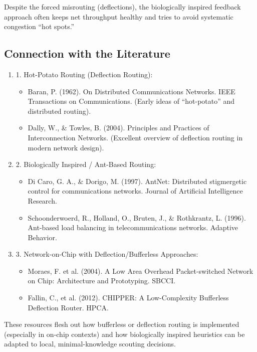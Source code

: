 Despite the forced misrouting (deflections), the biologically inspired feedback approach often keeps net throughput healthy and tries to avoid systematic congestion ``hot spots.''

\subsection{Connection with the Literature}%

\begin{enumerate}
\item 	1.	Hot-Potato Routing (Deflection Routing):
	\begin{itemize}
	\item Baran, P. (1962). On Distributed Communications Networks. IEEE Transactions on Communications. (Early ideas of “hot-potato” and distributed routing).
	\item Dally, W., \& Towles, B. (2004). Principles and Practices of Interconnection Networks. (Excellent overview of deflection routing in modern network design).
 	\end{itemize}

\item 	2.	Biologically Inspired / Ant-Based Routing:
	\begin{itemize}
	\item Di Caro, G. A., \& Dorigo, M. (1997). AntNet: Distributed stigmergetic control for communications networks. Journal of Artificial Intelligence Research.
	\item Schoonderwoerd, R., Holland, O., Bruten, J., \& Rothkrantz, L. (1996). Ant-based load balancing in telecommunications networks. Adaptive Behavior.
	\end{itemize}
\item	3.	Network-on-Chip with Deflection/Bufferless Approaches:
	\begin{itemize}
	\item Moraes, F. et al. (2004). A Low Area Overhead Packet-switched Network on Chip: Architecture and Prototyping. SBCCI.
	\item Fallin, C., et al. (2012). CHIPPER: A Low-Complexity Bufferless Deflection Router. HPCA.
	\end{itemize}
\end{enumerate}

These resources flesh out how bufferless or deflection routing is implemented (especially in on-chip contexts) and how biologically inspired heuristics can be adapted to local, minimal-knowledge scouting decisions.

